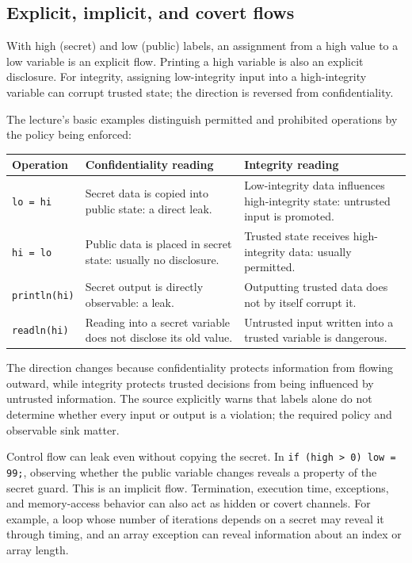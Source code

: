 \documentclass[11pt,a4paper]{article}
\numberwithin{figure}{section}
\begin{document}
\subsection{Explicit, implicit, and covert flows}
With high (secret) and low (public) labels, an assignment from a high value to a low variable is an explicit flow. Printing a high variable is also an explicit disclosure. For integrity, assigning low-integrity input into a high-integrity variable can corrupt trusted state; the direction is reversed from confidentiality.

The lecture's basic examples distinguish permitted and prohibited operations by the policy being enforced:
\begin{center}\small
\begin{tabularx}{\linewidth}{@{}p{28mm}YY@{}}\toprule
Operation & Confidentiality reading & Integrity reading\\\midrule
\texttt{lo = hi} & Secret data is copied into public state: a direct leak. & Low-integrity data influences high-integrity state: untrusted input is promoted.\\
\texttt{hi = lo} & Public data is placed in secret state: usually no disclosure. & Trusted state receives high-integrity data: usually permitted.\\
\texttt{println(hi)} & Secret output is directly observable: a leak. & Outputting trusted data does not by itself corrupt it.\\
\texttt{readln(hi)} & Reading into a secret variable does not disclose its old value. & Untrusted input written into a trusted variable is dangerous.\\\bottomrule
\end{tabularx}\end{center}
The direction changes because confidentiality protects information from flowing outward, while integrity protects trusted decisions from being influenced by untrusted information. The source explicitly warns that labels alone do not determine whether every input or output is a violation; the required policy and observable sink matter.

Control flow can leak even without copying the secret. In \texttt{if (high > 0) low = 99;}, observing whether the public variable changes reveals a property of the secret guard. This is an implicit flow. Termination, execution time, exceptions, and memory-access behavior can also act as hidden or covert channels. For example, a loop whose number of iterations depends on a secret may reveal it through timing, and an array exception can reveal information about an index or array length.
\end{document}

